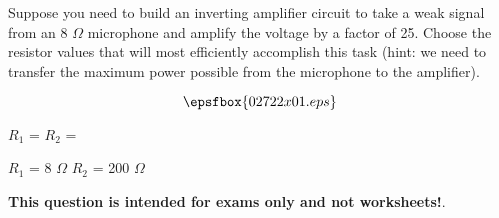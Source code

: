 

Suppose you need to build an inverting amplifier circuit to take a weak signal from an 8 $\Omega$ microphone and amplify the voltage by a factor of 25.  Choose the resistor values that will most efficiently accomplish this task (hint: we need to transfer the maximum power possible from the microphone to the amplifier).

$$\epsfbox{02722x01.eps}$$

$R_1$ = \hskip 80pt $R_2$ = 







$R_1$ = 8 $\Omega$ \hskip 30pt $R_2$ = 200 $\Omega$ 







{\bf This question is intended for exams only and not worksheets!}.





